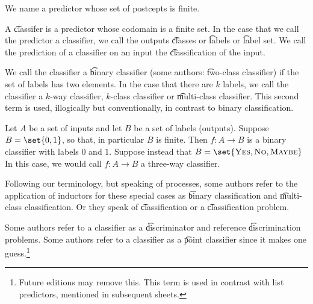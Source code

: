 

We name a predictor whose set of postcepts is finite.


A \t{classifer} is a predictor whose codomain is a finite set.
In the case that we call the predictor a classifier, we call the outputs \t{classes} or \t{labels} or \t{label set}.
We call the prediction of a classifier on an input the \t{classification} of the input.

We call the classifier a \t{binary classifier} (some authors: \t{two-class classifier}) if the set of labels has two elements.
In the case that there are $k$ labels, we call the classifier a \t{$k$-way classifier}, \t{$k$-class classifier} or \t{multi-class classifier}.
This second term is used, illogically but conventionally, in contrast to binary classification.

Let $A$ be a set of inputs and let $B$ be a set of labels (outputs).
Suppose $B = \set{0, 1}$, so that, in particular $B$ is finite.
Then $f: A \to B$ is a binary classifier with labels $0$ and $1$.
Suppose instead that $B = \set{\text{\textsc{Yes}}, \textsc{No}, \textsc{Maybe}}$
In this case, we would call $f: A \to B$ a three-way classifier.


Following our terminology, but speaking of processes, some authors refer to the application of inductors for these special cases as \t{binary classification} and \t{multi-class classification}.
Or they speak of \t{classification} or a \t{classification problem}.

Some authors refer to a classifier as a \t{discriminator} and reference \t{discrimination problems}.
Some authors refer to a classifier as a \t{point classifier} since it makes one guess.\footnote{Future editions may remove this. This term is used in contrast with list predictors, mentioned in subsequent sheets.}

